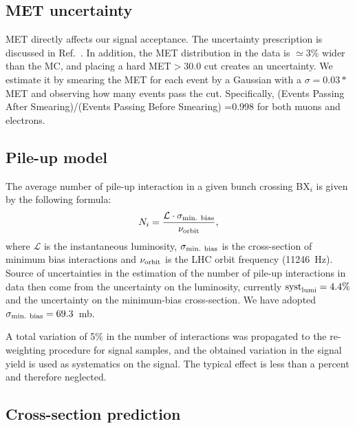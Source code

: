 \subsection{MET uncertainty}

MET directly affects our signal acceptance. 
The uncertainty prescription is discussed in Ref.~\cite{met}.
In addition, the MET distribution in the data is $\simeq$3\% wider 
than the MC, and placing a hard MET$>30.0$ cut creates an uncertainty. 
We estimate it by smearing the MET for each event by a Gaussian with 
a $\sigma =0.03*$MET and observing how many events pass the cut. 
Specifically, (Events Passing After Smearing)/(Events Passing Before Smearing) 
=0.998 for both muons and electrons.


\subsection{Pile-up model}


The average number of pile-up interaction in a given bunch crossing
BX$_{i}$ is given by the following formula:
\begin{equation}
N_{i} = \frac{\mathcal{L} \cdot \sigma_{\textnormal{min. bias}}}{\nu_{\textnormal{orbit}}},
\end{equation}
where $\mathcal{L}$ is the instantaneous luminosity,
$\sigma_{\textnormal{min. bias}}$ is the cross-section of minimum bias
interactions and $\nu_{\textnormal{orbit}}$ is the LHC orbit frequency
(11246~Hz).  Source of uncertainties in the estimation of the number
of pile-up interactions in data then come from the uncertainty on the
luminosity, currently $\textnormal{syst}_{\textnormal{lumi}}=4.4\%$ and
the uncertainty on the minimum-bias cross-section. We have adopted
$\sigma_{\textnormal{min. bias}}=69.3$~mb.

A total variation of 5\% in the number of interactions was propagated to the
re-weighting procedure for signal samples, and the obtained variation
in the signal yield is used as systematics on the signal. The typical
effect is less than a percent and therefore neglected.


\subsection{Cross-section prediction}


